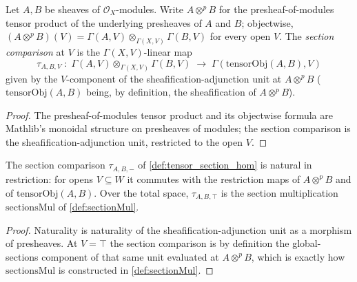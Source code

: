 \begin{definition}
  \label{def:tensor_section_hom}
  Let \(A, B\) be sheaves of \(\mathcal O_X\)-modules. Write \(A \otimes^p B\)
  for the presheaf-of-modules tensor product of the underlying presheaves of
  \(A\) and \(B\); objectwise, \((A \otimes^p B)(V) = \Gamma(A,V)
  \otimes_{\Gamma(X,V)} \Gamma(B,V)\) for every open \(V\). The
  \emph{section comparison} at \(V\) is the \(\Gamma(X,V)\)-linear map
  \[
    \tau_{A,B,V} \;:\; \Gamma(A,V) \otimes_{\Gamma(X,V)} \Gamma(B,V)
    \;\longrightarrow\; \Gamma(\mathrm{tensorObj}(A,B), V)
  \]
  given by the \(V\)-component of the sheafification-adjunction unit at
  \(A \otimes^p B\) (\(\mathrm{tensorObj}(A,B)\) being, by definition, the
  sheafification of \(A \otimes^p B\)).
\end{definition}
\begin{proof}\leanok
  The presheaf-of-modules tensor product and its objectwise formula are
  Mathlib's monoidal structure on presheaves of modules; the section
  comparison is the sheafification-adjunction unit, restricted to the open
  \(V\).
\end{proof}

\begin{lemma}
  \label{lem:tensor_section_hom_naturality}
  The section comparison \(\tau_{A,B,-}\) of \cref{def:tensor_section_hom}
  is natural in restriction: for opens \(V \subseteq W\) it commutes with
  the restriction maps of \(A \otimes^p B\) and of \(\mathrm{tensorObj}(A,B)\).
  Over the total space, \(\tau_{A,B,\top}\) is the section multiplication
  \(\mathrm{sectionsMul}\) of \cref{def:sectionMul}.
\end{lemma}
\begin{proof}\leanok
  Naturality is naturality of the sheafification-adjunction unit as a
  morphism of presheaves. At \(V = \top\) the section comparison is by
  definition the global-sections component of that same unit evaluated at
  \(A \otimes^p B\), which is exactly how \(\mathrm{sectionsMul}\) is
  constructed in \cref{def:sectionMul}.
\end{proof}

